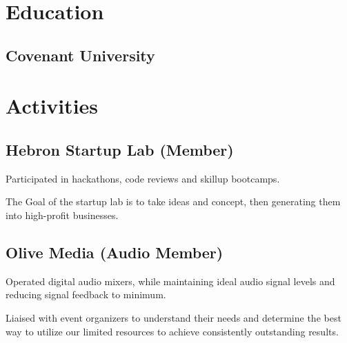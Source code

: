 \documentclass[]{openfont}
\begin{document}
\hfill
\begin{minipage}[t]{0.33\textwidth} 
\section{Education} 

\subsection{Covenant University}

\sectionsep




\section{Activities}
\subsection{ Hebron Startup Lab (Member) }
\vspace{\topsep}
\begin{tightemize}
\item Participated in hackathons, code reviews and skillup bootcamps.
\item The Goal of the startup lab is to take ideas and concept, then generating them into high-profit businesses.
\end{tightemize}
\sectionsep

\subsection{ Olive Media (Audio Member) }
\vspace{\topsep}
\begin{tightemize}
\item Operated digital audio mixers, while maintaining ideal audio signal levels and reducing signal feedback to minimum.
\item Liaised with event organizers to understand their needs and determine the best way to utilize our limited resources to achieve consistently outstanding results.
\end{tightemize}
\sectionsep






\end{minipage}
\end{document}
